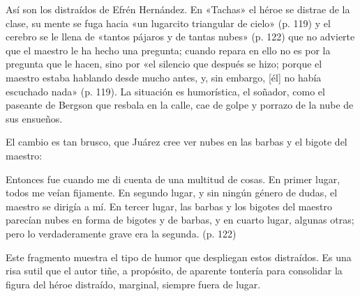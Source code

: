 \documentclass[14pt,twoside,final]{extbook} %
\begin{document}
Así son los distraídos de Efrén Hernández. En «Tachas» el héroe se distrae de la clase, su mente se fuga hacia «un lugarcito triangular de cielo» (p. 119) y el cerebro se le llena de «tantos pájaros y de tantas nubes» (p. 122) que no advierte que el maestro le ha hecho una pregunta; cuando repara en ello no es por la pregunta que le hacen, sino por «el silencio que después se hizo; porque el maestro estaba hablando desde mucho antes, y, sin embargo, [él] no había escuchado nada» (p. 119). La situación es humorística, el soñador, como el paseante de Bergson que resbala en la calle, cae de golpe y porrazo de la nube de sus ensueños.

El cambio es tan brusco, que Juárez cree ver nubes en las barbas y el bigote del maestro:
\begin{quoting}
Entonces fue cuando me di cuenta de una multitud de cosas. En primer lugar, todos me veían fijamente. En segundo lugar, y sin ningún género de dudas, el maestro se dirigía a mí. En tercer lugar, las barbas y los bigotes del maestro parecían nubes en forma de bigotes y de barbas, y en cuarto lugar, algunas otras; pero lo verdaderamente grave era la segunda. (p. 122)
\end{quoting}
Este fragmento muestra el tipo de humor que despliegan estos distraídos. Es una risa sutil que el autor tiñe, a propósito, de aparente tontería para consolidar la figura del héroe distraído, marginal, siempre fuera de lugar.
\end{document}
